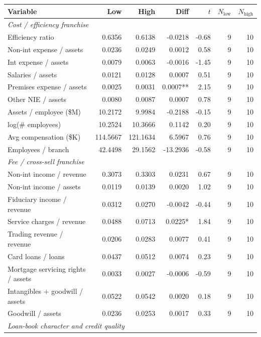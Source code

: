 \begin{tabular}{lrrrrrr}
\toprule
Variable & Low & High & Diff & $t$ & $N_{\text{low}}$ & $N_{\text{high}}$ \\
\midrule
\multicolumn{7}{l}{\emph{Cost / efficiency franchise}} \\
\midrule
Efficiency ratio & 0.6356 & 0.6138 & -0.0218 & -0.68 & 9 & 10 \\
Non-int expense / assets & 0.0236 & 0.0249 & 0.0012 & 0.58 & 9 & 10 \\
Int expense / assets & 0.0079 & 0.0063 & -0.0016 & -1.45 & 9 & 10 \\
Salaries / assets & 0.0121 & 0.0128 & 0.0007 & 0.51 & 9 & 10 \\
Premises expense / assets & 0.0025 & 0.0031 & 0.0007** & 2.15 & 9 & 10 \\
Other NIE / assets & 0.0080 & 0.0087 & 0.0007 & 0.78 & 9 & 10 \\
Assets / employee (\$M) & 10.2172 & 9.9984 & -0.2188 & -0.15 & 9 & 10 \\
log(\# employees) & 10.2524 & 10.3666 & 0.1142 & 0.20 & 9 & 10 \\
Avg compensation (\$K) & 114.5667 & 121.1634 & 6.5967 & 0.76 & 9 & 10 \\
Employees / branch & 42.4498 & 29.1562 & -13.2936 & -0.58 & 9 & 10 \\
\midrule
\multicolumn{7}{l}{\emph{Fee / cross-sell franchise}} \\
\midrule
Non-int income / revenue & 0.3073 & 0.3303 & 0.0231 & 0.67 & 9 & 10 \\
Non-int income / assets & 0.0119 & 0.0139 & 0.0020 & 1.02 & 9 & 10 \\
Fiduciary income / revenue & 0.0312 & 0.0270 & -0.0042 & -0.44 & 9 & 10 \\
Service charges / revenue & 0.0488 & 0.0713 & 0.0225* & 1.84 & 9 & 10 \\
Trading revenue / revenue & 0.0206 & 0.0283 & 0.0077 & 0.41 & 9 & 10 \\
Card loans / loans & 0.0437 & 0.0512 & 0.0074 & 0.23 & 9 & 10 \\
Mortgage servicing rights / assets & 0.0033 & 0.0027 & -0.0006 & -0.59 & 9 & 10 \\
Intangibles + goodwill / assets & 0.0522 & 0.0542 & 0.0020 & 0.18 & 9 & 10 \\
Goodwill / assets & 0.0236 & 0.0253 & 0.0017 & 0.33 & 9 & 10 \\
\midrule
\multicolumn{7}{l}{\emph{Loan-book character and credit quality}} \\

\end{tabular}
